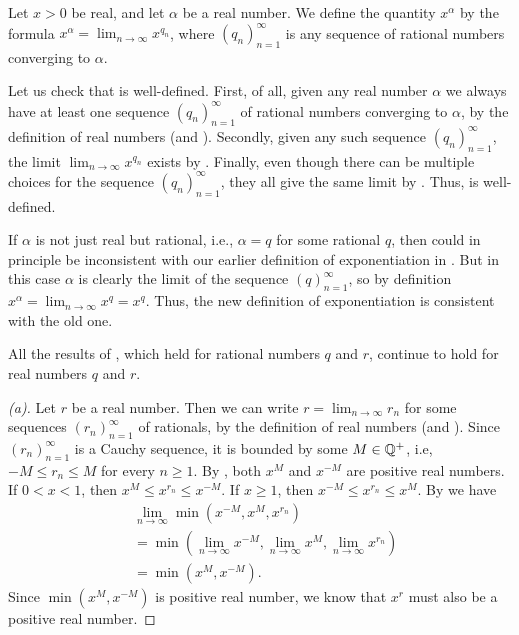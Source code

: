 \begin{defn}\label{i:6.7.2}
  Let \(x > 0\) be real, and let \(\alpha\) be a real number.
  We define the quantity \(x^\alpha\) by the formula \(x^\alpha = \lim_{n \to \infty} x^{q_n}\), where \((q_n)_{n = 1}^\infty\) is any sequence of rational numbers converging to \(\alpha\).
\end{defn}

\begin{note}
  Let us check that  is well-defined.
  First, of all, given any real number \(\alpha\) we always have at least one sequence \((q_n)_{n = 1}^\infty\) of rational numbers converging to \(\alpha\), by the definition of real numbers (and ).
  Secondly, given any such sequence \((q_n)_{n = 1}^\infty\), the limit \(\lim_{n \to \infty} x^{q_n}\) exists by .
  Finally, even though there can be multiple choices for the sequence \((q_n)_{n = 1}^\infty\), they all give the same limit by .
  Thus,  is well-defined.
\end{note}

\begin{note}
  If \(\alpha\) is not just real but rational, i.e., \(\alpha = q\) for some rational \(q\), then  could in principle be inconsistent with our earlier definition of exponentiation in .
  But in this case \(\alpha\) is clearly the limit of the sequence \((q)_{n = 1}^\infty\), so by definition \(x^\alpha = \lim_{n \to \infty} x^q = x^q\).
  Thus, the new definition of exponentiation is consistent with the old one.
\end{note}

\begin{prop}\label{i:6.7.3}
  All the results of , which held for rational numbers \(q\) and \(r\), continue to hold for real numbers \(q\) and \(r\).
\end{prop}

\begin{proof}[(a)]
  Let \(r\) be a real number.
  Then we can write \(r = \lim_{n \to \infty} r_n\) for some sequences \((r_n)_{n = 1}^\infty\) of rationals, by the definition of real numbers (and ).
  Since \((r_n)_{n = 1}^\infty\) is a Cauchy sequence, it is bounded by some \(M \in \mathbb{Q}^+\), i.e, \(-M \leq r_n \leq M\) for every \(n \geq 1\).
  By , both \(x^M\) and \(x^{-M}\) are positive real numbers.
  If \(0 < x < 1\), then \(x^M \leq x^{r_n} \leq x^{-M}\).
  If \(x \geq 1\), then \(x^{-M} \leq x^{r_n} \leq x^M\).
  By  we have
  \begin{align*}
     & \lim_{n \to \infty} \min(x^{-M}, x^M, x^{r_n})                                           \\
     & = \min(\lim_{n \to \infty} x^{-M}, \lim_{n \to \infty} x^M, \lim_{n \to \infty} x^{r_n}) \\
     & = \min(x^M, x^{-M}).
  \end{align*}
  Since \(\min(x^M, x^{-M})\) is positive real number, we know that \(x^r\) must also be a positive real number.
\end{proof}

